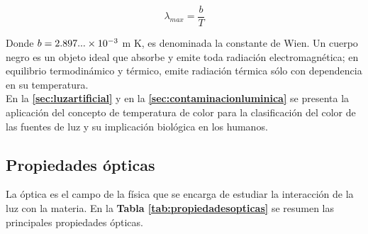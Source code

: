 \begin{equation}
\lambda_{max} = \dfrac{b}{T}
\end{equation}

Donde $b = 2.897...\times 10^{-3}$ m K, es denominada la constante de Wien. Un cuerpo negro es un objeto ideal que absorbe y emite toda radiación electromagnética; en equilibrio termodinámico y térmico, emite radiación térmica sólo con dependencia en su temperatura.\\

En la \textbf{\autoref{sec:luzartificial}} y en la \textbf{\autoref{sec:contaminacionluminica}} se presenta la aplicación del concepto de temperatura de color para la clasificación del color de las fuentes de luz y su implicación biológica en los humanos.\\

\subsection{Propiedades ópticas}

La óptica es el campo de la física que se encarga de estudiar la interacción de la luz con la materia. En la  \textbf{Tabla \ref{tab:propiedadesopticas}} se resumen las principales propiedades ópticas.

\begin{table}[]
\centering
\caption{Propiedades ópticas de la luz  \citep{Born&Wolf2003}}
\label{tab:propiedadesopticas}
\end{table}

